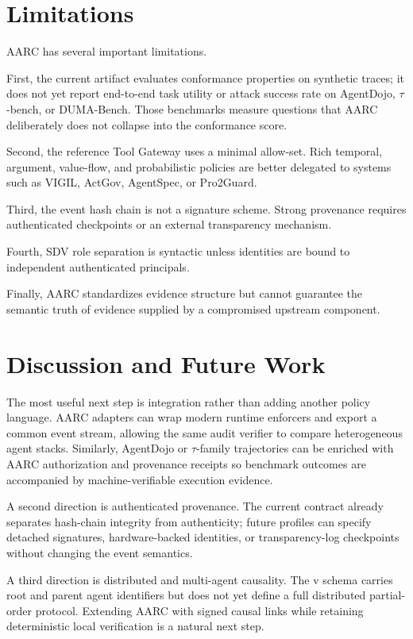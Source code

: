 \documentclass{article}
\begin{document}
\section{Limitations}

AARC has several important limitations.

First, the current artifact evaluates conformance properties on synthetic traces;
it does not yet report end-to-end task utility or attack success rate on
AgentDojo, $\tau$-bench, or DUMA-Bench. Those benchmarks measure questions that
AARC deliberately does not collapse into the conformance score.

Second, the reference Tool Gateway uses a minimal allow-set. Rich temporal,
argument, value-flow, and probabilistic policies are better delegated to systems
such as VIGIL, ActGov, AgentSpec, or Pro2Guard.

Third, the event hash chain is not a signature scheme. Strong provenance requires
authenticated checkpoints or an external transparency mechanism.

Fourth, SDV role separation is syntactic unless identities are bound to
independent authenticated principals.

Finally, AARC standardizes evidence structure but cannot guarantee the semantic
truth of evidence supplied by a compromised upstream component.

\section{Discussion and Future Work}

The most useful next step is integration rather than adding another policy
language. AARC adapters can wrap modern runtime enforcers and export a common
event stream, allowing the same audit verifier to compare heterogeneous agent
stacks. Similarly, AgentDojo or $\tau$-family trajectories can be enriched with
AARC authorization and provenance receipts so benchmark outcomes are accompanied
by machine-verifiable execution evidence.

A second direction is authenticated provenance. The current contract already
separates hash-chain integrity from authenticity; future profiles can specify
detached signatures, hardware-backed identities, or transparency-log
checkpoints without changing the event semantics.

A third direction is distributed and multi-agent causality. The v\specVersion{}
schema carries root and parent agent identifiers but does not yet define a
full distributed partial-order protocol. Extending AARC with signed causal
links while retaining deterministic local verification is a natural next step.
\end{document}
